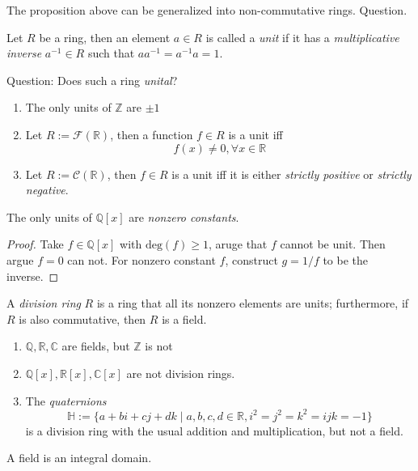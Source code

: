 \begin{remark}
The proposition above can be generalized into non-commutative rings. Question.
\end{remark}
\begin{definition}
Let $R$ be a ring, then an element $a\in R$ is called a \emph{unit} if it has a \emph{multiplicative inverse} $a^{-1}\in R$ such that $aa^{-1}=a^{-1}a=1$.
\end{definition}
Question: Does such a ring \emph{unital}?
\begin{example}
\begin{enumerate}
\item
The only units of $\mathbb{Z}$ are $\pm1$
\item
Let $R:=\mathcal{F}(\mathbb{R})$, then a function $f\in R$ is a unit iff
\[
f(x)\ne0,\forall x\in\mathbb{R}
\]
\item
Let $R:=\mathcal{C}(\mathbb{R})$, then $f\in R$ is a unit iff it is either \emph{strictly positive} or \emph{strictly negative}.

\end{enumerate}
\end{example}
\begin{proposition}
The only units of $\mathbb{Q}[x]$ are \emph{nonzero constants}.
\end{proposition}
\begin{proof}
Take $f\in\mathbb{Q}[x]$ with $\mbox{deg}(f)\ge1$, aruge that $f$ cannot be unit. Then argue $f=0$ can not. For nonzero constant $f$, construct $g=1/f$ to be the inverse.
\end{proof}
\begin{definition}
A \emph{division ring} $R$ is a ring that all its nonzero elements are units; furthermore, if $R$ is also commutative, then $R$ is a field.
\end{definition}
\begin{example}
\begin{enumerate}
\item
$\mathbb{Q},\mathbb{R},\mathbb{C}$ are fields, but $\mathbb{Z}$ is not
\item
$\mathbb{Q}[x],\mathbb{R}[x],\mathbb{C}[x]$ are not division rings.
\item
The \emph{quaternions}
\[
\mathbb{H}:=\{a+bi+cj+dk\mid a,b,c,d\in\mathbb{R},i^2=j^2=k^2=ijk=-1\}
\]
is a division ring with the usual addition and multiplication, but not a field.
\end{enumerate}
\end{example}
\begin{proposition}
A field is an integral domain.
\end{proposition}
